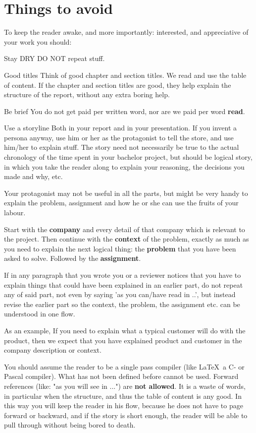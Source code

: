 \section{Things to avoid}
To keep the reader awake, and more importantly: interested, and appreciative of your work you should:
\begin{Description}
\item[Stay DRY] DO NOT repeat stuff.
\item[Good titles] Think of good chapter and section titles. We read and use the table of content. If the chapter and section titles are good, they help explain the structure of the report, without any extra boring help.
\item[Be brief] You do not get paid per written word, nor are we paid per word \textbf{read}.
\item[Use a storyline] Both in your report and in your presentation. If you invent a persona anyway, use him or her as the protagonist to tell the store, and use him/her to explain stuff.
The story need not necessarily be true to the actual chronology of the time spent in your bachelor project, but should be logical story, in which you take the reader along to explain your reasoning, the decisions you made and why, etc.
\end{Description}

Your protagonist may not be useful in all the parts, but might be very handy to explain the problem, assignment and how he or she can use the fruits of your labour.

Start with the \textbf{company} and every detail of that company which is relevant to the project.
Then continue with the \textbf{context} of the problem, exactly as much as you need to explain the next logical thing: the \textbf{problem} that you have been asked to solve. Followed by the \textbf{assignment}.

If in any paragraph that you wrote you or a reviewer notices that you have to explain things
that could have been explained in an earlier part, do not repeat any of said part,
not even by saying 'as you can/have read in ..', but instead revise the earlier part so the context, the problem, the assignment etc. can be understood in one flow.

As an example, If you need to explain what a typical customer will do with the product, then we expect that you have explained product and customer in the company description or context.

You should assume the reader to be a single pass compiler (like \LaTeX\ a C- or Pascal compiler). What has not been defined before cannot be used.
Forward references (like: "as you will see in ...") are \textbf{not allowed}. It is a waste of words, in particular when the structure, and thus the table of content is any good.
In this way you will keep the reader in his flow, because he does not have to page forward or backward, and if the story is short enough, the reader will be able to pull through without being bored to death.

